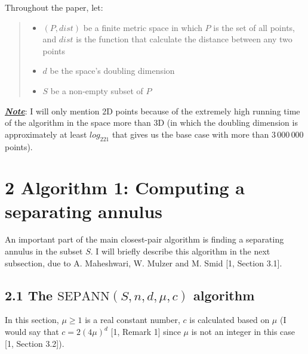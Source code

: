 \documentclass[12pt,english,]{article}
\newcommand{\pnt}[1]{{\scriptstyle#1}}
\begin{document}
\vspace{-2truemm}

Throughout the paper, let:

\vspace{-2truemm}

\begin{quote}
\begin{itemize}
\item $(P, dist)$ be a finite metric space in which $P$ is the set of all points, and $dist$ is the function that calculate the distance between any two points
\item $d$ be the space's doubling dimension
\item $S$ be a non-empty subset of $P$
\end{itemize}
\end{quote}

\vspace{-2truemm}

\underline{\emph{\textbf{Note}}}: I will only mention 2D points because
of the extremely high running time of the algorithm in the space more
than 3D (in which the doubling dimension is approximately at least
\boldmath\(log_221\) that gives us the base case with more than
\(3\,000\,000\) points). \unboldmath

\newpage

\hypertarget{section2}{%
\section{\texorpdfstring{2 \enspace Algorithm 1: Computing a separating
annulus}{2 Algorithm 1: Computing a separating annulus}}\label{section2}}

An important part of the main closest-pair algorithm is finding a
separating annulus in the subset \(S\). I will briefly describe this
algorithm in the next subsection, due to A. Maheshwari, W. Mulzer and M.
Smid {[}1, Section 3.1{]}.

\hypertarget{section2.1}{%
\subsection{\texorpdfstring{2.1 The
\(\mathrm{S\pnt{EP}A\pnt{NN}}(S,n,d,\mu,c)\)
algorithm}{2.1 The \textbackslash{}mathrm\{S\textbackslash{}pnt\{EP\}A\textbackslash{}pnt\{NN\}\}(S,n,d,\textbackslash{}mu,c) algorithm}}\label{section2.1}}

In this section, \(\mu \ge1\) is a real constant number, \(c\) is
calculated based on \(\mu\) (I would say that \(c = 2(4\mu)^d\) {[}1,
Remark 1{]} since \(\mu\) is not an integer in this case {[}1, Section
3.2{]}).
\end{document}
